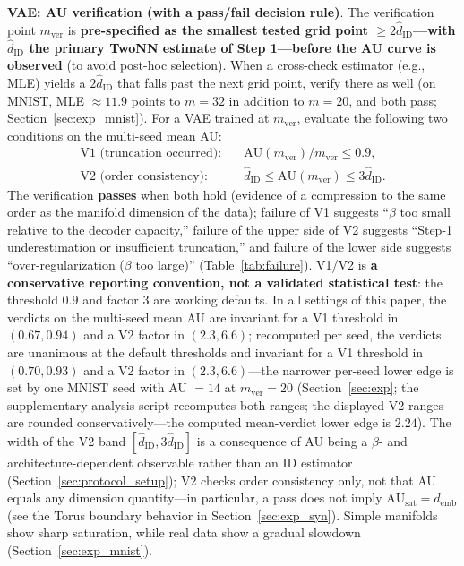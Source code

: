 \documentclass[make,article,submit,pdftex,moreauthors]{Definitions/mdpi}
\newcommand{\hatdID}{\hat{d}_{\mathrm{ID}}}
\newcommand{\AUsat}{\mathrm{AU}_{\mathrm{sat}}}
\newcommand{\demb}{d_{\mathrm{emb}}}
\begin{document}
\textbf{VAE: AU verification (with a pass/fail decision rule)}.
The verification point $m_{\mathrm{ver}}$ is \textbf{pre-specified as the
smallest tested grid point $\geq 2\hatdID$---with $\hatdID$ the primary
TwoNN estimate of Step 1---before the AU curve is observed} (to avoid
post-hoc selection).
When a cross-check estimator (e.g., MLE) yields a $2\hatdID$ that falls
past the next grid point, verify there as well (on MNIST, MLE
$\approx 11.9$ points to $m = 32$ in addition to $m = 20$, and both pass;
Section~\ref{sec:exp_mnist}).
For a VAE trained at $m_{\mathrm{ver}}$, evaluate the following two
conditions on the multi-seed mean AU:
\begin{align}
  \text{V1 (truncation occurred)}:&\quad
  \mathrm{AU}(m_{\mathrm{ver}}) / m_{\mathrm{ver}} \leq 0.9,
  \label{eq:rule_v1}\\
  \text{V2 (order consistency)}:&\quad
  \hatdID \leq \mathrm{AU}(m_{\mathrm{ver}}) \leq 3\hatdID.
  \label{eq:rule_v2}
\end{align}
The verification \textbf{passes} when both hold (evidence of a compression
to the same order as the manifold dimension of the data);
failure of V1 suggests ``$\beta$ too small relative to the decoder
capacity,'' failure of the upper side of V2 suggests ``Step-1
underestimation or insufficient truncation,'' and failure of the lower side
suggests ``over-regularization ($\beta$ too large)''
(Table~\ref{tab:failure}).
V1/V2 is \textbf{a conservative reporting convention, not a validated
statistical test}: the threshold $0.9$ and factor $3$ are working defaults.
In all settings of this paper, the verdicts on the multi-seed mean AU are
invariant for a V1 threshold in $(0.67, 0.94)$ and a V2 factor in
$(2.3, 6.6)$; recomputed per seed, the verdicts are unanimous at the
default thresholds and invariant for a V1 threshold in $(0.70, 0.93)$ and
a V2 factor in $(2.3, 6.6)$---the narrower per-seed lower edge is set by
one MNIST seed with AU $= 14$ at $m_{\mathrm{ver}} = 20$
(Section~\ref{sec:exp}; the supplementary analysis script recomputes both
ranges; the displayed V2 ranges are rounded conservatively---the computed
mean-verdict lower edge is $2.24$).
The width of the V2 band $[\hatdID, 3\hatdID]$ is a consequence of AU being
a $\beta$- and architecture-dependent observable rather than an ID
estimator (Section~\ref{sec:protocol_setup}); V2 checks order consistency
only, not that AU equals any dimension quantity---in particular, a pass
does not imply $\AUsat = \demb$ (see the Torus boundary behavior in
Section~\ref{sec:exp_syn}).
Simple manifolds show sharp saturation, while real data show a gradual
slowdown (Section~\ref{sec:exp_mnist}).
\end{document}
